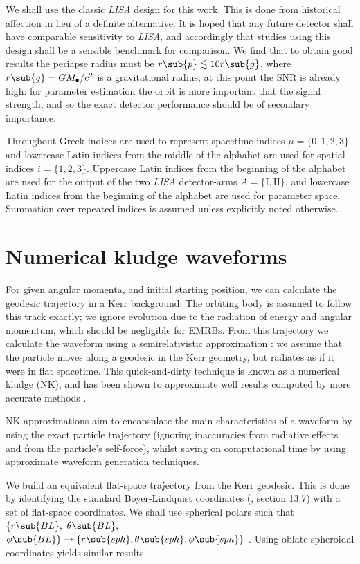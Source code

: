 \documentclass[11pt,twoside]{article}
\begin{document}
We shall use the classic \textit{LISA} design for this work. This is done from historical affection in lieu of a definite alternative. It is hoped that any future detector shall have comparable sensitivity to \textit{LISA}, and accordingly that studies using this design shall be a sensible benchmark for comparison. We find that to obtain good results the periapse radius must be $r\sub{p} \lesssim 10 r\sub{g}$, where $r\sub{g} = GM_\bullet / c^2$ is a gravitational radius, at this point the SNR is already high: for parameter estimation the orbit is more important that the signal strength, and so the exact detector performance should be of secondary importance.

Throughout Greek indices are used to represent spacetime indices $\mu = \{0,1,2,3\}$ and lowercase Latin indices from the middle of the alphabet are used for spatial indices $i = \{1,2,3\}$. Uppercase Latin indices from the beginning of the alphabet are used for the output of the two \textit{LISA} detector-arms $A = \{\mathrm{I}, \mathrm{II}\}$, and lowercase Latin indices from the beginning of the alphabet are used for parameter space. Summation over repeated indices is assumed unless explicitly noted otherwise.

\section{Numerical kludge waveforms}

For given angular momenta, and initial starting position, we can calculate the geodesic trajectory in a Kerr background. The orbiting body is assumed to follow this track exactly; we ignore evolution due to the radiation of energy and angular momentum, which should be negligible for EMRBs. From this trajectory we calculate the waveform using a semirelativistic approximation \citep{Ruffini1981}: we assume that the particle moves along a geodesic in the Kerr geometry, but radiates as if it were in flat spacetime. This quick-and-dirty technique is known as a numerical kludge (NK), and has been shown to approximate well results computed by more accurate methods \citep{Babak2007}.

NK approximations aim to encapsulate the main characteristics of a waveform by using the exact particle trajectory (ignoring inaccuracies from radiative effects and from the particle's self-force), whilst saving on computational time by using approximate waveform generation techniques.

We build an equivalent flat-space trajectory from the Kerr geodesic. This is done by identifying the standard Boyer-Lindquist coordinates (\citealt*{Boyer1967, Hobson2006}, section 13.7) with a set of flat-space coordinates. We shall use spherical polars such that $\{r\sub{BL},$ $\theta\sub{BL},$ $\phi\sub{BL}\} \rightarrow \{r\sub{sph}, \theta\sub{sph}, \phi\sub{sph}\}$ \citep{Gair2005, Babak2007}. Using oblate-spheroidal coordinates yields similar results.
\end{document}
